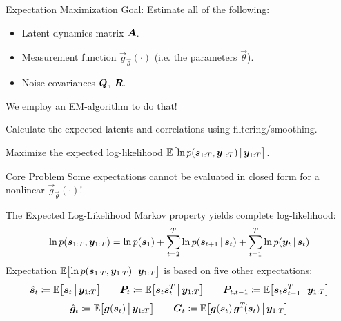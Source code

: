 \documentclass[
	aspectratio=43,
	color={accentcolor=1c},
	logo=false,
	colorframetitle=true,
]{tudabeamer}
\begin{document}
	\begin{frame}{Expectation Maximization}
		Goal: Estimate all of the following:
		\begin{itemize}
			\item Latent dynamics matrix \( \bm{A} \).
			\item Measurement function \( \vec{g}_{\vec{\theta}}(\cdot) \) (i.e. the parameters \( \vec{\theta} \)).
			\item Noise covariances \(\bm{Q}\), \(\bm{R}\).
		\end{itemize}

		We employ an EM-algorithm to do that!
		\begin{description}[leftmargin = 2cm]
			\item[E-Step] Calculate the expected latents and correlations using filtering/smoothing.
			\item[M-Step] Maximize the expected log-likelihood \( \mathbb{E}\big[\! \ln p(\bm{s}_{1:T}, \bm{y}_{1:T}) \,\vert\, \bm{y}_{1:T} \big] \).
		\end{description}
		\begin{alertblock}{Core Problem}
			Some expectations cannot be evaluated in closed form for a nonlinear \( \vec{g}_{\vec{\theta}}(\cdot) \)!
		\end{alertblock}
	\end{frame}

	\begin{frame}{The Expected Log-Likelihood}
		Markov property yields complete log-likelihood:
		\begin{align*}
			\ln p(\bm{s}_{1:T}, \bm{y}_{1:T}) = \ln p(\bm{s}_1) + \sum_{t = 2}^{T} \ln p(\bm{s}_{t + 1} \,\vert\, \bm{s}_t) + \sum_{t = 1}^{T} \ln p(\bm{y}_t \,\vert\, \bm{s}_t)
		\end{align*}
		Expectation \( \mathbb{E}\big[\! \ln p(\bm{s}_{1:T}, \bm{y}_{1:T}) \,\vert\, \bm{y}_{1:T} \big] \) is based on five other expectations:
		\begin{align*}
			\hat{\bm{s}}_t \coloneqq \mathbb{E}\big[ \bm{s}_t \,\big\vert\, \bm{y}_{1:T} \big]
			\qquad
			\bm{P}_t \coloneqq \mathbb{E}\big[ \bm{s}_t \bm{s}_t^T \,\big\vert\, \bm{y}_{1:T} \big]
			\qquad
			\bm{P}_{t, t - 1} \coloneqq \mathbb{E}\big[ \bm{s}_t \bm{s}_{t - 1}^T \,\big\vert\, \bm{y}_{1:T} \big]
		\end{align*}
		\begin{align*}
			\hat{\bm{g}}_t \coloneqq \mathbb{E}\big[ \bm{g}(\bm{s}_t) \,\big\vert\, \bm{y}_{1:T} \big]
			\qquad
			\bm{G}_t \coloneqq \mathbb{E}\big[ \bm{g}(\bm{s}_t) \, \bm{g}^T\!(\bm{s}_t) \,\big\vert\, \bm{y}_{1:T} \big]
		\end{align*}
	\end{frame}
\end{document}
